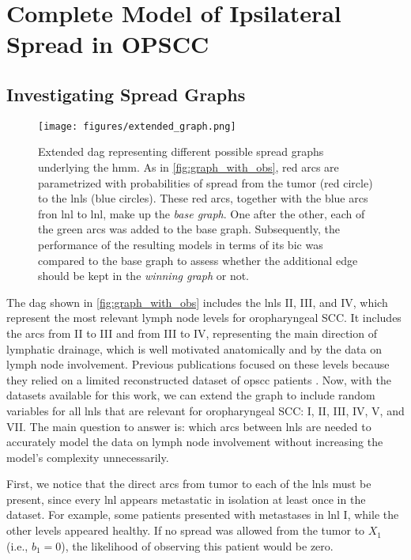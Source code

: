 \documentclass[twocolumn]{aastex631}
\begin{document}
\section{Complete Model of Ipsilateral Spread in OPSCC}
\label{sec:complete_model}


\subsection{Investigating Spread Graphs}
\label{subsec:complete_model:graphs}

\begin{figure}
    \centering
    \texttt{[image: figures/extended\_graph.png]}
    \caption{Extended \gls{dag} representing different possible spread graphs underlying the \gls{hmm}. As in \cref{fig:graph_with_obs}, red arcs are parametrized with probabilities of spread from the tumor (red circle) to the \glspl{lnl} (blue circles). These red arcs, together with the blue arcs fron \gls{lnl} to \gls{lnl}, make up the \emph{base graph}. One after the other, each of the green arcs was added to the base graph. Subsequently, the performance of the resulting models in terms of its \gls{bic} was compared to the base graph to assess whether the additional edge should be kept in the \emph{winning graph} or not.}
    \label{fig:extended_graph}
\end{figure}

The \gls{dag} shown in \cref{fig:graph_with_obs} includes the \glspl{lnl} II, III, and IV, which represent the most relevant lymph node levels for oropharyngeal SCC. It includes the arcs from II to III and from III to IV, representing the main direction of lymphatic drainage, which is well motivated anatomically and by the data on lymph node involvement. Previous publications  \cite{pouymayou_bayesian_2019,ludwig_hidden_2021} focused on these levels because they relied on a limited reconstructed dataset of \gls{opscc} patients \cite{sanguineti_defining_2009}. Now, with the datasets available for this work, we can extend the graph to include random variables for all \glspl{lnl} that are relevant for oropharyngeal SCC: I, II, III, IV, V, and VII. The main question to answer is: which arcs between \glspl{lnl} are needed to accurately model the data on lymph node involvement without increasing the model's complexity unnecessarily.

First, we notice that the direct arcs from tumor to each of the \glspl{lnl} must be present, since every \gls{lnl} appears metastatic in isolation at least once in the dataset. For example, some patients presented with metastases in \gls{lnl} I, while the other levels appeared healthy. If no spread was allowed from the tumor to $X_1$ (i.e., $b_1 = 0$), the likelihood of observing this patient would be zero.
\end{document}

